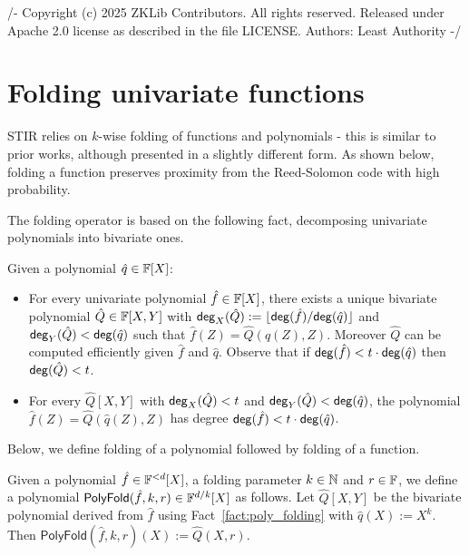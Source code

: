 /-
Copyright (c) 2025 ZKLib Contributors. All rights reserved.
Released under Apache 2.0 license as described in the file LICENSE.
Authors: Least Authority
-/

\section{Folding univariate functions}\label{sec:folding_uf}
STIR relies on $k$-wise folding of functions and polynomials - this is similar to prior works, although presented in a slightly different form. As shown below, folding a function preserves proximity from the Reed-Solomon code with high probability. 

The folding operator is based on the following fact, decomposing univariate polynomials into bivariate ones.

\begin{fact}\label{fact:poly_folding} %
\leanok
Given a polynomial $\hat{q}\in\mathbb{F}[X]$:
\begin{itemize}
    \item For every univariate polynomial $\hat{f}\in\mathbb{F}[X]$, there exists a unique bivariate polynomial $\hat{Q}\in\mathbb{F}[X,Y]$ with $\mathsf{deg}_X(\hat{Q}):=\lfloor{\mathsf{deg}(\hat{f})}/{\mathsf{deg}(\hat{q})}\rfloor$ and $\mathsf{deg}_Y(\hat{Q})<\mathsf{deg}(\hat{q})$ such that $\hat{f}(Z)=\hat{Q}(\hat{q}(Z),Z)$. Moreover $\hat{Q}$ can be computed efficiently given $\hat{f}$ and $\hat{q}$. Observe that if $\mathsf{deg}(\hat{f})<t\cdot\mathsf{deg}(\hat{q})$ then $\mathsf{deg}(\hat{Q})<t$.
    \item For every $\hat{Q}[X,Y]$ with $\mathsf{deg}_X(\hat{Q})<t$ and $\mathsf{deg}_Y(\hat{Q})<\mathsf{deg}(\hat{q})$, the polynomial $\hat{f}(Z)=\hat{Q}(\hat{q}(Z),Z)$ has degree $\mathsf{deg}(\hat{f})<t\cdot\mathsf{deg}(\hat{q})$.
\end{itemize}
\end{fact}

Below, we define folding of a polynomial followed by folding of a function.
\begin{definition}\label{def:poly_folding}
\leanok
{}
    Given a polynomial $\hat{f}\in\mathbb{F}^{<d}[X]$, a folding parameter $k\in\mathbb{N}$ and $r\in\mathbb{F}$, we define a polynomial $\mathsf{PolyFold}(\hat{f},k,r)\in\mathbb{F}^{d/k}[X]$ as follows. Let $\hat{Q}[X,Y]$ be the bivariate polynomial derived from $\hat{f}$ using Fact~\ref{fact:poly_folding} with $\hat{q}(X):=X^k$. Then $\mathsf{PolyFold}(\hat{f},k,r)(X):=\hat{Q}(X,r)$.
\end{definition}


